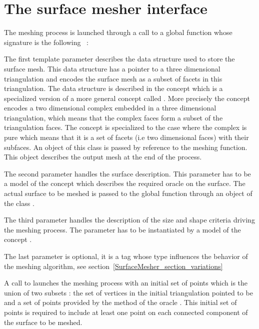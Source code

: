\section{The surface mesher interface}
\label{SurfaceMesher_section_interface}

The meshing process is launched through a call to a global function
whose signature is the following ~:


The first template parameter  describes 
the data structure
used to store  the surface mesh. This data structure
has a pointer to a three dimensional triangulation and encodes
the surface mesh as a subset of facets in this triangulation.
The data structure is described in the concept
 which is a specialized version
of a more general concept called  .
More precisely the concept 
encodes a two dimensional complex embedded  in a three dimensional
triangulation, which means that the complex  faces form a subset
of the triangulation faces. The concept  is 
specialized to the case where the complex is pure which means that it
is a set of facets (i.e two dimensional faces) with  their subfaces.
An object of this class is passed by reference to the meshing
function. This object describes the output mesh at the end of the
process.

The second parameter  handles the surface
description. This parameter  has to be a model of
the concept  which describes the
required oracle on the surface. The actual surface to be meshed is
passed  to the global function through an object of the class .

The third parameter handles the description of the size and shape
criteria driving the meshing process. The parameter 
has to be instantiated by a model of the concept .


The last parameter is optional, it is a tag 
whose type influences the behavior of the
meshing algorithm, see section~\ref{SurfaceMesher_section_variations}

A call to 
 launches 
the meshing process with an initial 
set of points which is the union of two subsets :
the set of vertices in the  initial triangulation pointed to be 
and a set of points provided by the  method 
of the oracle . This initial set of points is required 
to include at least one point on each connected component of the surface
to be meshed.


